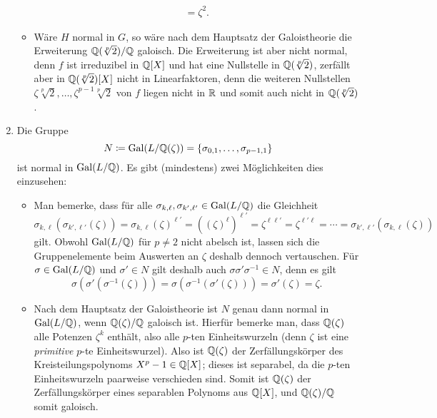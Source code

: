 \begin{solution}
\begin{enumerate}
\begin{itemize}
\begin{gather*}
            = \zeta^2.
          \end{gather*}
        \item
          Wäre $H$ normal in $G$, so wäre nach dem Hauptsatz der Galoistheorie die Erweiterung $\mathbb{Q}(\sqrt[p]{2})/\mathbb{Q}$ galoisch.
          Die Erweiterung ist aber nicht normal, denn $f$ ist irreduzibel in $\mathbb{Q}[X]$ und hat eine Nullstelle in $\mathbb{Q}(\sqrt[p]{2})$, zerfällt aber in $\mathbb{Q}(\sqrt[p]{2})[X]$ nicht in Linearfaktoren, denn die weiteren Nullstellen $\zeta \sqrt[p]{2}, \dotsc, \zeta^{p-1} \sqrt[p]{2}$ von $f$ liegen nicht in $\mathbb{R}$ und somit auch nicht in $\mathbb{Q}(\sqrt[p]{2})$.
      \end{itemize}
      
    \item
       Die Gruppe
      \[
                  N
        \coloneqq \operatorname{Gal}(L / \mathbb{Q}(\zeta) )
        =         \{ \sigma_{0,1}, \dotsc, \sigma_{p-1,1} \}
      \]
      ist normal in $\operatorname{Gal}(L / \mathbb{Q})$.
      Es gibt (mindestens) zwei Möglichkeiten dies einzusehen:
      \begin{itemize}
        \item
          Man bemerke, dass für alle $\sigma_{k, \ell}, \sigma_{k', \ell'} \in \operatorname{Gal}(L/\mathbb{Q})$ die Gleichheit
          \[
              \sigma_{k, \ell}( \sigma_{k', \ell'}( \zeta ) )
            = \sigma_{k, \ell}( \zeta )^{\ell'}
            = ((\zeta)^{\ell})^{\ell'}
            = \zeta^{\ell \ell'}
            = \zeta^{\ell' \ell}
            = \dotsb
            = \sigma_{k', \ell'}( \sigma_{k, \ell}( \zeta ) )
          \]
          gilt.
          Obwohl $\operatorname{Gal}(L/\mathbb{Q})$ für $p \neq 2$ nicht abelsch ist, lassen sich die Gruppenelemente beim Auswerten an $\zeta$ deshalb dennoch vertauschen.
          Für $\sigma \in \operatorname{Gal}(L/\mathbb{Q})$ und $\sigma' \in N$ gilt deshalb auch $\sigma \sigma' \sigma^{-1} \in N$, denn es gilt
          \[
              \sigma( \sigma'( \sigma^{-1}( \zeta ) ) )
            = \sigma( \sigma^{-1}( \sigma'( \zeta ) ) )
            = \sigma'( \zeta )
            = \zeta.
          \]
          
        \item
          Nach dem Hauptsatz der Galoistheorie ist $N$ genau dann normal in $\operatorname{Gal}(L/\mathbb{Q})$, wenn $\mathbb{Q}(\zeta)/\mathbb{Q}$ galoisch ist.
          Hierfür bemerke man, dass $\mathbb{Q}(\zeta)$ alle Potenzen $\zeta^k$ enthält, also alle $p$-ten Einheitswurzeln (denn $\zeta$ ist eine \emph{primitive} $p$-te Einheitswurzel).
          Also ist $\mathbb{Q}(\zeta)$ der Zerfällungskörper des Kreisteilungspolynoms $X^p - 1 \in \mathbb{Q}[X]$; dieses ist separabel, da die $p$-ten Einheitswurzeln paarweise verschieden sind.
          Somit ist $\mathbb{Q}(\zeta)$ der Zerfällungskörper eines separablen Polynoms aus $\mathbb{Q}[X]$, und $\mathbb{Q}(\zeta)/\mathbb{Q}$ somit galoisch.
      \end{itemize}
  \end{enumerate}
  

\end{solution}

